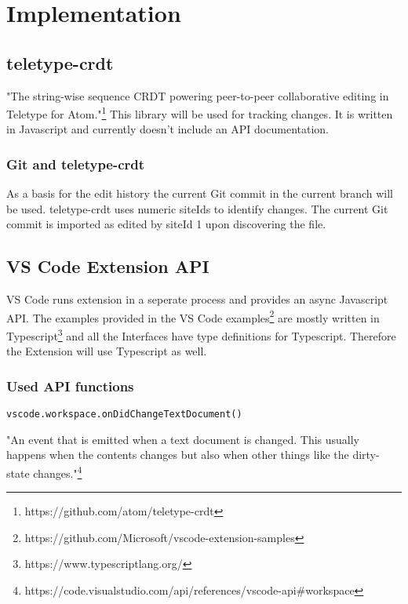 \chapter{Implementation}

\section{teletype-crdt}

"The string-wise sequence CRDT powering peer-to-peer collaborative editing in Teletype for Atom."\footnote{https://github.com/atom/teletype-crdt}
This library will be used for tracking changes. It is written in Javascript and currently doesn't include an API documentation.

\subsection{Git and teletype-crdt}
As a basis for the edit history  the current Git commit in the current branch will be used. teletype-crdt uses numeric siteIds to identify changes. The current Git commit is imported as edited by siteId 1 upon discovering the file.

\section{VS Code Extension API}

VS Code runs extension in a seperate process and provides an async Javascript API.
The examples provided in the VS Code examples\footnote{https://github.com/Microsoft/vscode-extension-samples} are mostly written in Typescript\footnote{https://www.typescriptlang.org/} and all the Interfaces have type definitions for Typescript.
Therefore the Extension will use Typescript as well.

\subsection{Used API functions}

\begin{lstlisting}
vscode.workspace.onDidChangeTextDocument()
\end{lstlisting}

"An event that is emitted when a text document is changed. This usually happens when the contents changes but also when other things like the dirty-state changes."\footnote{https://code.visualstudio.com/api/references/vscode-api\#workspace}

